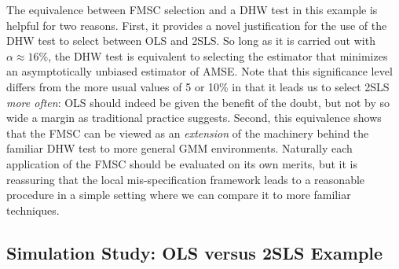 \documentclass[12pt]{article}
\theoremstyle{definition}
\begin{document}
The equivalence between FMSC selection and a DHW test in this example is helpful for two reasons. 
First, it provides a novel justification for the use of the DHW test to select between OLS and 2SLS. So long as it is carried out with $\alpha \approx 16\%$, the DHW test is equivalent to selecting the estimator that minimizes an asymptotically unbiased estimator of AMSE. 
Note that this significance level differs from the more usual values of 5 or 10\% in that it leads us to select 2SLS \emph{more often}: OLS should indeed be given the benefit of the doubt, but not by so wide a margin as traditional practice suggests. 
Second, this equivalence shows that the FMSC can be viewed as an \emph{extension} of the machinery behind the familiar DHW test to more general GMM environments. 
Naturally each application of the FMSC should be evaluated on its own merits, but it is reassuring that the local mis-specification framework leads to a reasonable procedure in a simple setting where we can compare it to more familiar techniques.

\subsection{Simulation Study: OLS versus 2SLS Example}
\end{document}
